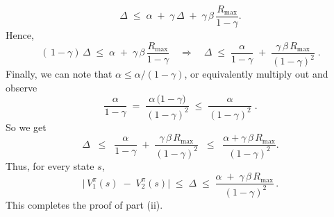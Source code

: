 \[
  \Delta 
  \;\le\;
  \alpha \;+\;\gamma\,\Delta 
  \;+\;\gamma\,\beta\,\frac{R_{\max}}{1-\gamma}.
\]
Hence,
\[
  (\,1-\gamma)\,\Delta
  \;\le\;
  \alpha \;+\;\gamma\,\beta\,\frac{R_{\max}}{1-\gamma}
  \quad\Longrightarrow\quad
  \Delta 
  \;\le\;
  \frac{\alpha}{1-\gamma}
  \;+\;
  \frac{\gamma\,\beta\,R_{\max}}{(1-\gamma)^2}
  \;.
\]
Finally, we can note that \(\alpha\le \alpha/(1-\gamma)\), 
or equivalently multiply out and observe
\[
  \frac{\alpha}{1-\gamma}
  \;=\;
  \frac{\alpha\,\bigl(1-\gamma\bigr)}{(1-\gamma)^2}
  \;\le\;
  \frac{\alpha}{(1-\gamma)^2}\;.
\]
So we get
\[
  \Delta 
  \;\;\le\;\;
  \frac{\alpha}{1-\gamma} 
  \;+\;
  \frac{\gamma\,\beta\,R_{\max}}{(1-\gamma)^2}
  \;\;\le\;\;
  \frac{\alpha + \gamma\,\beta\,R_{\max}}{(1-\gamma)^2}.
\]
Thus, for every state \(s\),
\[
  \bigl|\,V_{1}^{\pi}(s)\;-\;V_{2}^{\pi}(s)\bigr|
  \;\le\;
  \Delta
  \;\le\;
  \frac{\alpha \;+\;\gamma\,\beta\,R_{\max}}{\,(1-\gamma)^2}\,.
\]
This completes the proof of part (ii).